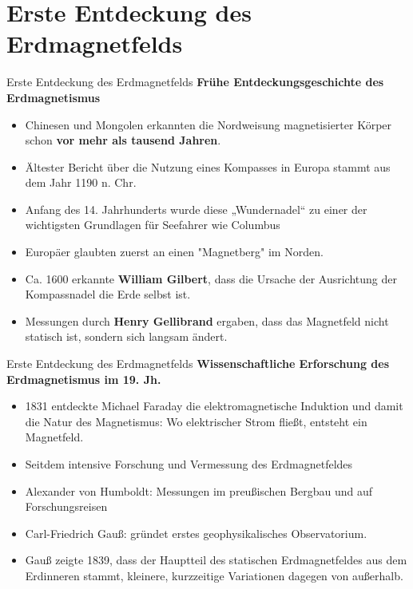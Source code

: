 \documentclass[10pt]{beamer}
\begin{document}
\section{Erste Entdeckung des Erdmagnetfelds}
\begin{frame}{Erste Entdeckung des Erdmagnetfelds}
    \textbf{Frühe Entdeckungsgeschichte des Erdmagnetismus}\pause
    \begin{itemize}
    \item Chinesen und Mongolen erkannten die Nordweisung magnetisierter Körper schon \textbf{vor mehr als tausend Jahren}. \pause
    \item Ältester Bericht über die Nutzung eines Kompasses in Europa stammt aus dem Jahr 1190 n. Chr.\pause
    \item Anfang des 14. Jahrhunderts wurde diese „Wundernadel“ zu einer der wichtigsten Grundlagen für Seefahrer wie Columbus\pause
    \item Europäer glaubten zuerst an einen "Magnetberg" im Norden.\pause
    \item Ca. 1600 erkannte \textbf{William Gilbert}, dass die Ursache der Ausrichtung der Kompassnadel die Erde selbst ist.\pause
    \item Messungen durch \textbf{Henry Gellibrand} ergaben, dass das Magnetfeld nicht statisch ist, sondern sich langsam ändert.\pause
    \end{itemize}
\end{frame}

\begin{frame}{Erste Entdeckung des Erdmagnetfelds}
    \textbf{Wissenschaftliche Erforschung des Erdmagnetismus im 19. Jh.}\pause
  \begin{itemize}
    \item 1831 entdeckte Michael Faraday die elektromagnetische Induktion und damit die Natur des Magnetismus: Wo elektrischer Strom fließt, entsteht ein Magnetfeld.\pause
    \item Seitdem intensive Forschung und Vermessung des Erdmagnetfeldes\pause
    \item Alexander von Humboldt: Messungen im preußischen Bergbau und auf Forschungsreisen\pause
    \item Carl-Friedrich Gauß: gründet erstes geophysikalisches Observatorium.\pause
    
    \item Gauß zeigte 1839, dass der Hauptteil des statischen Erdmagnetfeldes aus dem Erdinneren stammt, kleinere, kurzzeitige Variationen dagegen von außerhalb. \pause
\end{itemize}
\end{frame}
\end{document}
